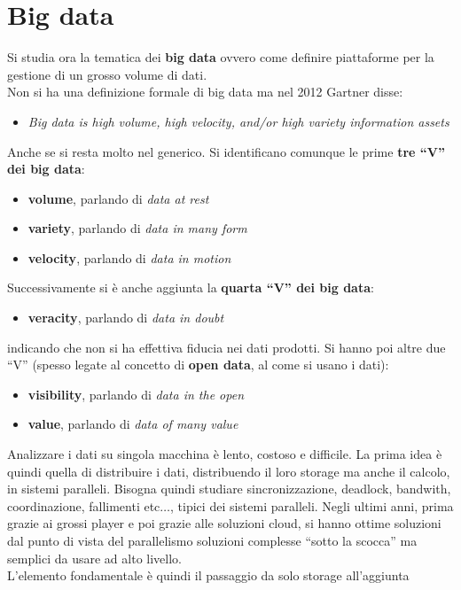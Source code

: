 \documentclass[a4paper,12pt, oneside]{book}
\begin{document}
\chapter{Big data}
Si studia ora la tematica dei \textbf{big data} ovvero come definire piattaforme
per la gestione di un grosso volume di dati.\\
Non si ha una definizione formale di big data ma nel 2012 Gartner disse:
\begin{itemize}
  \item \textit{Big data is high volume, high velocity, and/or high variety
    information assets} 
\end{itemize}
Anche se si resta molto nel generico. Si identificano comunque le prime
\textbf{tre ``V'' dei big data}:
\begin{itemize}
  \item \textbf{volume}, parlando di \textit{data at rest}
  \item \textbf{variety}, parlando di \textit{data in many form}
  \item \textbf{velocity}, parlando di \textit{data in motion}
\end{itemize}
Successivamente si è anche aggiunta la \textbf{quarta ``V'' dei big data}:
\begin{itemize}
  \item \textbf{veracity}, parlando di \textit{data in doubt}
\end{itemize}
indicando che non si ha effettiva fiducia nei dati prodotti. Si hanno poi altre
due ``V'' (spesso legate al concetto di \textbf{open data}, al come si usano i
dati): 
\begin{itemize}
  \item \textbf{visibility}, parlando di \textit{data in the open}
  \item \textbf{value}, parlando di \textit{data of many value}
\end{itemize}
Analizzare i dati su singola macchina è lento, costoso e difficile. La prima
idea è quindi quella di distribuire i dati, distribuendo il loro storage ma
anche il calcolo, in sistemi paralleli. Bisogna quindi studiare
sincronizzazione, deadlock, bandwith, coordinazione, fallimenti etc$\ldots$,
tipici dei sistemi paralleli. Negli ultimi anni, prima grazie ai grossi player e
poi grazie alle soluzioni cloud, si hanno ottime soluzioni dal punto di vista
del parallelismo soluzioni complesse ``sotto la scocca'' ma semplici da usare ad
alto livello.\\ 
L'elemento fondamentale è quindi il passaggio da solo storage all'aggiunta
\end{document}
